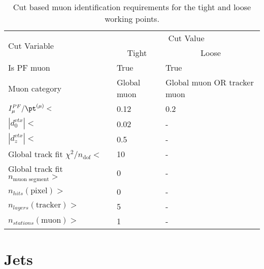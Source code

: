 \begin{table}[htbp]
    \caption{Cut based muon identification requirements for the tight and loose working points.}
    \centering
    \begin{tabular}{lll}
        \hline
        \multirow{2}{*}{Cut Variable}               & \multicolumn{2}{c}{Cut Value} \\\cline{2-3}
                                                    & \multicolumn{1}{c}{Tight}     & \multicolumn{1}{c}{Loose} \\\cline{2-3}
        \hline
        Is PF muon                                  & True        & True                        \\
        Muon category                               & Global muon & Global muon OR tracker muon \\
        $I_{\mu}^{PF}/\pt^{(\mu)}<$                 & 0.12        & 0.2                         \\
        $|d_{0}^{vtx}|<$                            & 0.02        & -                           \\
        $|d_{z}^{vtx}|<$                            & 0.5         & -                           \\
        Global track fit $\chi^{2}/n_{\text{dof}}<$ & 10          & -                           \\
        Global track fit $n_\text{muon segment}>$   & 0           & -                           \\
        $n_{hits}\left(\text{pixel}\right)>$        & 0           & -                           \\
        $n_{layers}\left(\text{tracker}\right)>$    & 5           & -                           \\
        $n_{stations}\left(\text{muon}\right)>$     & 1           & -                           \\
        \hline
    \end{tabular}
    \label{tab:muon_id_cut}
\end{table}

\section{Jets}
\label{sec:jets}

